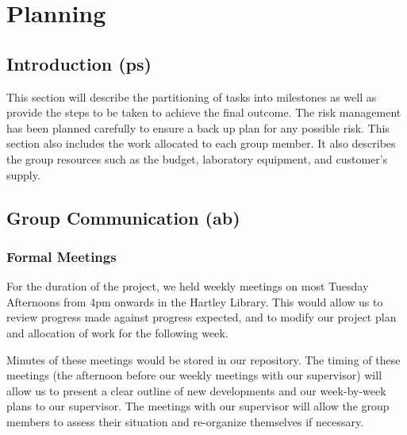 
\chapter{Planning}

\section{Introduction (ps)}
This section will describe the partitioning of tasks into milestones as well as provide the steps to be taken to achieve the final outcome.
The risk management has been planned carefully to ensure a back up plan for any possible risk.
This section also includes the work allocated to each group member.
It also describes the group resources such as the budget, laboratory equipment, and customer's supply. 








\section{Group Communication (ab)}
\label{group_comms}

\subsection{Formal Meetings}
\label{formal meetings}
For the duration of the project, we held weekly meetings on most Tuesday 
Afternoons from 4pm onwards in the Hartley Library. This would allow us to 
review progress made against progress expected, and to modify our project 
plan and allocation of work for the following week.

Minutes of these meetings would be stored in our repository.
The timing of these meetings (the afternoon before our weekly meetings with our 
supervisor) will allow us to present a clear outline 
of new developments and our week-by-week plans to our supervisor.
The meetings with our supervisor will allow the group members to assess their situation
and re-organize themselves if necessary.

